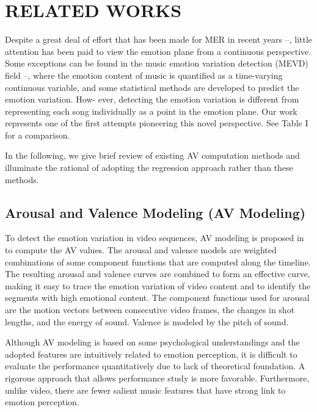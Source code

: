 \documentclass[journal, twoside]{IEEEtran}
\begin{document}
\section{RELATED WORKS}
Despite a great deal of effort that has been made for MER in
recent years \cite{1}--\cite{8}, little attention has been paid to view the
emotion plane from a continuous perspective. Some exceptions
can be found in the music emotion variation detection (MEVD)
field \cite{8}--\cite{11}, where the emotion content of music is quantified as a time-varying continuous variable, and some statistical
methods are developed to predict the emotion variation. How-
ever, detecting the emotion variation is different from representing each song individually as a point in the emotion plane.
Our work represents one of the first attempts pioneering this
novel perspective. See Table I for a comparison.

In the following, we give brief review of existing AV computation methods and illuminate the rational of adopting the regression approach rather than these methods.

\subsection{Arousal and Valence Modeling (AV Modeling)}
To detect the emotion variation in video sequences, AV modeling is proposed in \cite{9} to compute the AV values. The arousal and valence models are weighted combinations of some component functions that are computed along the timeline. The resulting arousal and valence curves are combined to form an effective curve, making it easy to trace the emotion variation of video content and to identify the segments with high emotional
content. The component functions used for arousal are the motion vectors between consecutive video frames, the changes in shot lengths, and the energy of sound. Valence is modeled by the pitch of sound.

Although AV modeling is based on some psychological understandings and the adopted features are intuitively related to emotion perception, it is difficult to evaluate the performance quantitatively due to lack of theoretical foundation. A rigorous approach that allows performance study is more favorable. Furthermore, unlike video, there are fewer salient music features that have strong link to emotion perception.
\end{document}
